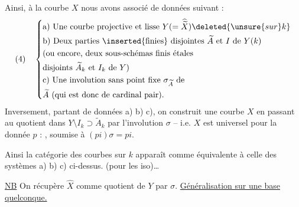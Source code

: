 Ainsi, à la courbe  $X$ nous avons associé  de données
suivant :
\[
(4)\quad\left\{\begin{aligned}
&\text{a) Une courbe projective et lisse }Y(=\widehat{\widetilde X})\deleted{\unsure{sur }k}\\
&\text{b) Deux parties }\inserted{\text{finies}}\text{ disjointes }\widetilde A\text{ et }I\text{ de }Y(k)\\
&\text{(ou encore, deux sous-schémas finis étales}\\
&\text{disjoints }\widetilde A_k\text{ et }I_k\text{ de }Y\text{)}\\
&\text{c) Une involution sans point fixe }\sigma_{\widetilde A}\text{ de}\\
&\widetilde A\text{ (qui est donc de cardinal pair).}
\end{aligned}\right.
\]
Inversement, partant de données a) b) c), on construit une courbe  $X$ en passant au quotient dans $Y\setminus I_k\supset\widetilde A_k$ par l'involution $\sigma$ -- i.e. $X$ est universel  pour la donnée $p$ :
, soumise à $(pi)\sigma=pi$.

Ainsi la catégorie des courbes  sur $k$  apparaît comme équivalente à celle des systèmes a) b) c) ci-dessus. (pour les iso)\ldots

\uline{NB} On récupère $\widehat X$ comme quotient de $Y$ par $\sigma$.
\uline{Généralisation sur une base quelconque.}

